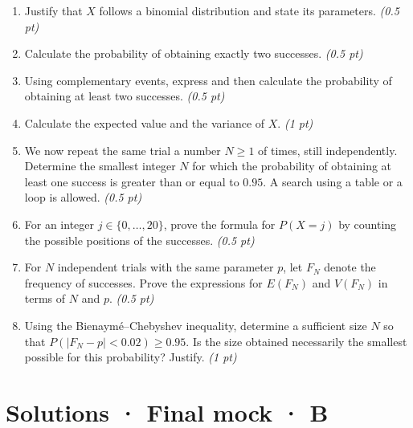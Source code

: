 \begin{enumerate}

\item Justify that $X$ follows a binomial distribution and state its parameters. \hfill\textit{(0.5 pt)}

\item Calculate the probability of obtaining exactly two successes. \hfill\textit{(0.5 pt)}

\item Using complementary events, express and then calculate the probability of obtaining at least two successes. \hfill\textit{(0.5 pt)}

\item Calculate the expected value and the variance of $X$. \hfill\textit{(1 pt)}

\item We now repeat the same trial a number $N\ge1$ of times, still independently. Determine the smallest integer $N$ for which the probability of obtaining at least one success is greater than or equal to $0.95$. A search using a table or a loop is allowed. \hfill\textit{(0.5 pt)}

\item For an integer $j\in\{0,\ldots,20\}$, prove the formula for $P(X=j)$ by counting the possible positions of the successes. \hfill\textit{(0.5 pt)}

\item For $N$ independent trials with the same parameter $p$, let $F_N$ denote the frequency of successes. Prove the expressions for $E(F_N)$ and $V(F_N)$ in terms of $N$ and $p$. \hfill\textit{(0.5 pt)}

\item Using the Bienaymé–Chebyshev inequality, determine a sufficient size $N$ so that $P(|F_N-p|<0.02)\ge0.95$. Is the size obtained necessarily the smallest possible for this probability? Justify. \hfill\textit{(1 pt)}

\end{enumerate}

\ifprof\clearpage

\section*{Solutions · Final mock · B}\label{cor:9-4}

